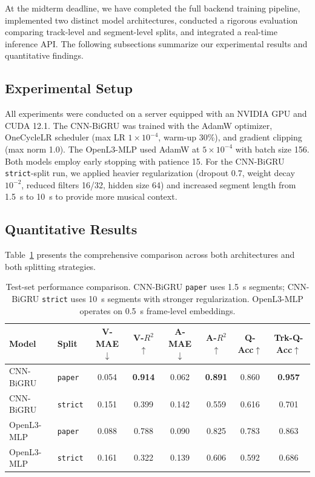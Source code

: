 \documentclass[12pt,a4paper]{article}
\begin{document}
At the midterm deadline, we have completed the full backend training pipeline, implemented two distinct model architectures, conducted a rigorous evaluation comparing track-level and segment-level splits, and integrated a real-time inference API. The following subsections summarize our experimental results and quantitative findings.

\subsection{Experimental Setup}

All experiments were conducted on a server equipped with an NVIDIA GPU and CUDA 12.1. The CNN-BiGRU was trained with the AdamW optimizer, OneCycleLR scheduler (max LR $1\times10^{-4}$, warm-up 30\%), and gradient clipping (max norm 1.0). The OpenL3-MLP used AdamW at $5\times10^{-4}$ with batch size 156. Both models employ early stopping with patience 15. For the CNN-BiGRU \texttt{strict}-split run, we applied heavier regularization (dropout 0.7, weight decay $10^{-2}$, reduced filters 16/32, hidden size 64) and increased segment length from 1.5~s to 10~s to provide more musical context.

\subsection{Quantitative Results}

Table~\ref{tab:results} presents the comprehensive comparison across both architectures and both splitting strategies.

\begin{table}[htbp]
\centering
\caption{Test-set performance comparison. CNN-BiGRU \texttt{paper} uses 1.5~s segments; CNN-BiGRU \texttt{strict} uses 10~s segments with stronger regularization. OpenL3-MLP operates on 0.5~s frame-level embeddings.}
\label{tab:results}
\small
\begin{tabular}{@{}l l c c c c c c@{}}
\toprule
\textbf{Model} & \textbf{Split} & \textbf{V-MAE$\downarrow$} & \textbf{V-$R^2$$\uparrow$} & \textbf{A-MAE$\downarrow$} & \textbf{A-$R^2$$\uparrow$} & \textbf{Q-Acc$\uparrow$} & \textbf{Trk-Q-Acc$\uparrow$} \\
\midrule
CNN-BiGRU & \texttt{paper} & 0.054 & \textbf{0.914} & 0.062 & \textbf{0.891} & 0.860 & \textbf{0.957} \\
CNN-BiGRU & \texttt{strict} & 0.151 & 0.399 & 0.142 & 0.559 & 0.616 & 0.701 \\
\midrule
OpenL3-MLP & \texttt{paper} & 0.088 & 0.788 & 0.090 & 0.825 & 0.783 & 0.863 \\
OpenL3-MLP & \texttt{strict} & 0.161 & 0.322 & 0.139 & 0.606 & 0.592 & 0.686 \\
\bottomrule
\end{tabular}
\end{table}
\end{document}
